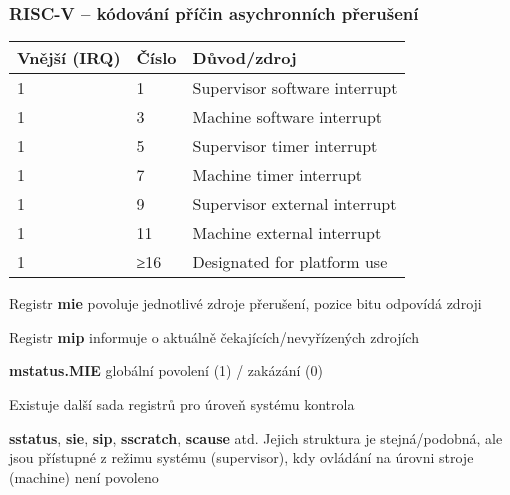 \documentclass{beamer}
\begin{document}
\begin{frame}
\frametitle{RISC-V -- kódování příčin asychronních přerušení}

\begin{center}
\small
\begin{tabular}{|l|l|l|}  \hline
Vnější (IRQ) & Číslo & Důvod/zdroj \\\hline
1 & 1 & Supervisor software interrupt \\\hline
1 & 3 & Machine software interrupt \\\hline
1 & 5 & Supervisor timer interrupt \\\hline
1 & 7 & Machine timer interrupt \\\hline
1 & 9 & Supervisor external interrupt \\\hline
1 & 11 & Machine external interrupt \\\hline
1 & ≥16  & Designated for platform use \\\hline
\end{tabular}
\end{center}

\small
Registr \textbf{mie} povoluje jednotlivé zdroje přerušení, pozice bitu odpovídá
zdroji

Registr \textbf{mip} informuje o aktuálně čekajících/nevyřízených zdrojích

\textbf{mstatus.MIE} globální povolení (1) / zakázání (0)

Existuje další sada registrů pro úroveň systému
kontrola

\textbf{sstatus}, \textbf{sie}, \textbf{sip}, \textbf{sscratch}, \textbf{scause} atd. Jejich struktura je
stejná/podobná, ale jsou přístupné z režimu systému (supervisor), kdy ovládání na úrovni stroje (machine) není povoleno
\end{frame}
\end{document}

